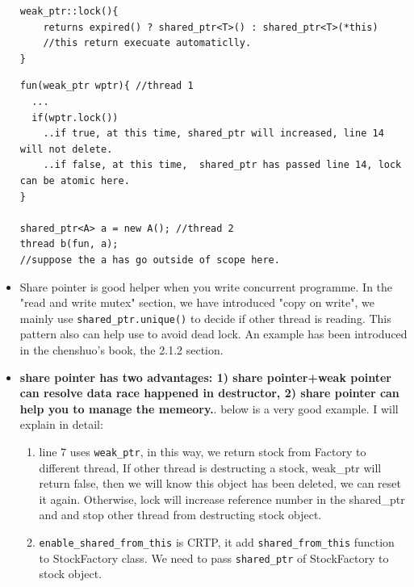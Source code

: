 \documentclass[a4paper,11pt,twoside]{book}
\begin{document}
\begin{itemize}
\begin{lstlisting}
weak_ptr::lock(){
	returns expired() ? shared_ptr<T>() : shared_ptr<T>(*this)
	//this return execuate automaticlly.
}	
\end{lstlisting}
        
\begin{lstlisting}[]
fun(weak_ptr wptr){ //thread 1
  ...
  if(wptr.lock())
    ..if true, at this time, shared_ptr will increased, line 14 will not delete.
    ..if false, at this time,  shared_ptr has passed line 14, lock can be atomic here. 
}

shared_ptr<A> a = new A(); //thread 2
thread b(fun, a);
//suppose the a has go outside of scope here.
\end{lstlisting}

    \item Share pointer is good helper when you write concurrent programme. In the "read and write mutex" section, we have introduced "copy on write", we mainly use \texttt{shared\_ptr.unique()} to decide if other thread is reading. This pattern also can help use to avoid dead lock. An example has been introduced in the chenshuo's book, the 2.1.2 section.


        \item \textbf{share pointer has two advantages: 1) share pointer+weak pointer can resolve data race happened in destructor, 2) share pointer can help you to manage the memeory.}. below is a very good example.  I will explain in detail:
\begin{enumerate}
    \item line 7 uses \texttt{weak\_ptr}, in this way, we return stock from Factory to different thread, If other thread is destructing a stock,  weak\_ptr will return false, then we will know this object has been deleted, we can reset it again.  Otherwise, lock will increase reference number in the shared\_ptr and and stop other thread from destructing stock object. 
    
    \item \texttt{enable\_shared\_from\_this} is CRTP, it add \texttt{shared\_from\_this} function to StockFactory class. We need to pass \texttt{shared\_ptr} of StockFactory to stock object. 


\end{enumerate}
\end{itemize}
\end{document}
